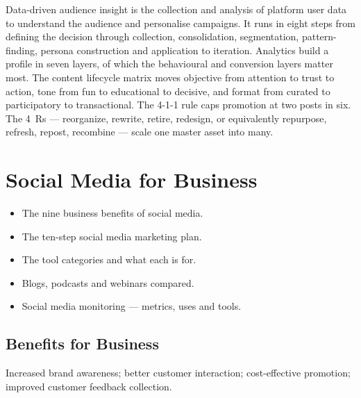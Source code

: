 \documentclass{MMTextbook}
\begin{document}
\begin{summarybox}
Data-driven audience insight is the collection and analysis of platform user
data to understand the audience and personalise campaigns. It runs in eight
steps from defining the decision through collection, consolidation,
segmentation, pattern-finding, persona construction and application to
iteration. Analytics build a profile in seven layers, of which the behavioural
and conversion layers matter most. The content lifecycle matrix moves objective
from attention to trust to action, tone from fun to educational to decisive, and
format from curated to participatory to transactional. The 4-1-1 rule caps
promotion at two posts in six. The 4~Rs --- reorganize, rewrite, retire,
redesign, or equivalently repurpose, refresh, repost, recombine --- scale one
master asset into many.
\end{summarybox}

\chapter{Social Media for Business}


\begin{learningoutcomes}
\begin{itemize}
\item The nine business benefits of social media.
\item The ten-step social media marketing plan.
\item The tool categories and what each is for.
\item Blogs, podcasts and webinars compared.
\item Social media monitoring --- metrics, uses and tools.
\end{itemize}
\end{learningoutcomes}

\section{Benefits for Business}

\begin{exambox}
Increased brand awareness; better customer interaction; cost-effective
promotion; improved customer feedback collection.
\end{exambox}
\end{document}

